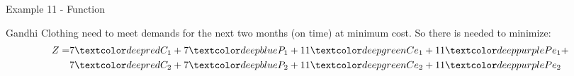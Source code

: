 \begin{frame}{Example 11 - Function}

Gandhi Clothing need to meet demands for the next two months (on time) at
minimum cost. So there is needed to minimize:
\LARGE{
\begin{align*}
    Z =& 7\colora{C_1} + 7\colorc{P_1} + 11\colorb{Ce_1} + 11\colord{Pe_1} + \\
       & 7\colora{C_2} + 7\colorc{P_2} + 11\colorb{Ce_2} + 11\colord{Pe_2}
\end{align*}
}

\end{frame}
